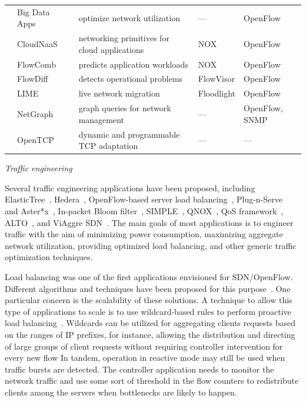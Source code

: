 {\begin{table}[!htp]
\begin{center}
\begin{tabularx}{\linewidth}{p{2cm}p{3.2cm}p{5.1cm}Xp{3.5cm}}
& Big Data Apps ~\cite{wang2012} & optimize network utilization & --- & OpenFlow   \\
& CloudNaaS~\cite{benson2011} & networking primitives for cloud applications & NOX &  OpenFlow  \\
& FlowComb~\cite{das2013} & predicts application workloads & NOX & OpenFlow \\
& FlowDiff~\cite{arefin2013} & detects operational problems & FlowVisor & OpenFlow \\
& LIME~\cite{keller2012} & live network migration & Floodlight & OpenFlow      \\
& NetGraph ~\cite{raghavendra2012} & graph queries for network management & --- & OpenFlow, SNMP   \\
& OpenTCP~\cite{ghobadi2013} & dynamic and programmable TCP adaptation & --- & --- \\
\hline
\end{tabularx}
\end{center}
\end{table}
}

\vspace{2mm}
\noindent \textit{Traffic engineering}

Several traffic engineering applications have been proposed, including 
ElasticTree~\cite{heller2010}, Hedera~\cite{al-fares2010},
OpenFlow-based server load balancing~\cite{wang2011},
Plug-n-Serve~\cite{handigol2009-1} and Aster*x~\cite{handigol2009},
In-packet Bloom filter~\cite{macapuna2010},
SIMPLE~\cite{qazi2013-1}, QNOX~\cite{jeong2012}, QoS framework~\cite{kim2010},
ALTO~\cite{scharf2013}, and ViAggre SDN~\cite{skoldstrom2013-1}.
The main goals of most applications is to engineer traffic with the aim of minimizing power consumption, maximizing aggregate network utilization, providing optimized load balancing, and other generic traffic optimization techniques.

Load balancing was one of the first applications envisioned for SDN/OpenFlow.
Different algorithms and techniques have been proposed for this purpose~\cite{wang2011,handigol2009,handigol2009-1}. 
One particular concern is the scalability of these solutions.
A technique to allow this type of applications to scale is to use wildcard-based rules to perform proactive load balancing~\cite{wang2011}.
Wildcards can be utilized for aggregating clients requests based on the ranges of IP prefixes, for instance, allowing the distribution and directing of large groups of client requests without requiring controller intervention for every new flow
In tandem, operation in reactive mode may still be used when traffic bursts are detected.
The controller application needs to monitor the network traffic and use some sort of 
threshold in the flow counters to redistribute clients among the servers when bottlenecks are likely to happen.


